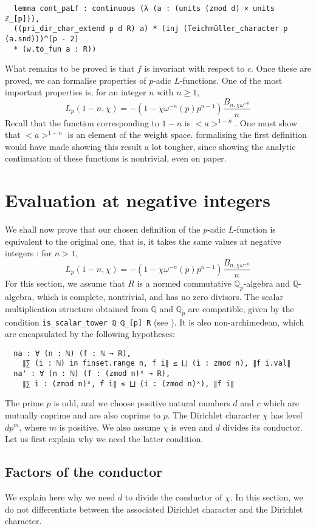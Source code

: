 \documentclass[a4paper,UKenglish,cleveref, autoref, thm-restate]{lipics-v2021}
\newcommand{\lean}[1]{\texttt{#1}\xspace} %
\begin{document}
\begin{lstlisting}
  lemma cont_paLf : continuous (λ (a : (units (zmod d) × units ℤ_[p])),
  ((pri_dir_char_extend p d R) a) * (inj (Teichmüller_character p (a.snd)))^(p - 2)
  * (w.to_fun a : R))
\end{lstlisting}

What remains to be proved is that $f$ is invariant with respect to $c$. 
Once these are proved, we can formalise properties of $p$-adic $L$-functions. One of the most
important properties is, for an integer $n$ with $n \ge 1$,
$$ L_p (1 - n, \chi) = -(1 - \chi \omega^{-n}(p)p^{n - 1}) \frac{B_{n, \chi \omega^{-n}}}{n} $$
Recall that the function corresponding to $1 - n$ is $<a>^{1 - n}$. One must show that $<a>^{1 - n}$ is 
an element of the weight space. formalising the first definition would have made showing this result a 
lot tougher, since showing the analytic continuation of these functions is nontrivial, even on paper.

\section{Evaluation at negative integers}
\label{section4}
We shall now prove that our chosen definition of the $p$-adic $L$-function is equivalent to the original one, that is, 
it takes the same values at negative integers : for $n > 1$,
$$ L_p (1 - n, \chi) = -(1 - \chi \omega^{-n}(p)p^{n - 1}) \frac{B_{n, \chi \omega^{-n}}}{n} $$
For this section, we assume that $R$ is a normed commutative $\mathbb{Q}_p$-algebra and $\mathbb{Q}$-algebra, 
which is complete, nontrivial, and has no zero divisors. The scalar multiplication structure obtained from $\mathbb{Q}$ 
and $\mathbb{Q}_p$ are compatible, given by the condition \lean{is\_scalar\_tower ℚ ℚ\_[p] R} (see \cite{DD}). It is also non-archimedean, which are encapsulated by the following hypotheses:
\begin{lstlisting}
  na : ∀ (n : ℕ) (f : ℕ → R), 
    ∥∑ (i : ℕ) in finset.range n, f i∥ ≤ ⨆ (i : zmod n), ∥f i.val∥
  na' : ∀ (n : ℕ) (f : (zmod n)ˣ → R), 
    ∥∑ i : (zmod n)ˣ, f i∥ ≤ ⨆ (i : (zmod n)ˣ), ∥f i∥
\end{lstlisting}
The prime $p$ is odd, and we choose positive natural numbers $d$ and $c$ which are mutually coprime and are also coprime to 
$p$. The Dirichlet character $\chi$ has level $d p^m$, where $m$ is positive. We also assume $\chi$ is even and $d$ divides 
its conductor. Let us first explain why we need the latter condition.

\subsection{Factors of the conductor}
We explain here why we need $d$ to divide the conductor of $\chi$. In this section, we do not differentiate between the associated Dirichlet 
character and the Dirichlet character. 
\end{document}
